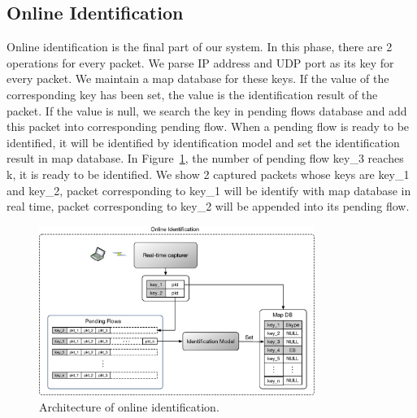 \documentclass[conference]{IEEEtran}
\begin{document}
\subsection{Online Identification}
Online identification is the final part of our system. In this phase, there are 2 operations for every packet. We parse IP address and UDP port as its key for every packet. We maintain a map database for these keys. If the value of the corresponding key has been set, the value is the identification result of the packet. If the value is null, we search the key in pending flows database and add this packet into corresponding pending flow. When a pending flow is ready to be identified, it will be identified by identification model and set the identification result in map database. In Figure~\ref{fig:online_architecture.eps}, the number of pending flow key\_3 reaches k, it is ready to be identified. We show 2 captured packets whose keys are key\_1 and key\_2, packet corresponding to key\_1 will be identify with map database in real time, packet corresponding to key\_2 will be appended into its pending flow.

\begin{figure}[htp]
\begin{center}
\includegraphics[width=0.8\textwidth]{online_architecture.eps}
\caption{Architecture of online identification.}\label{fig:online_architecture.eps}
\end{center}
\end{figure}
\end{document}
